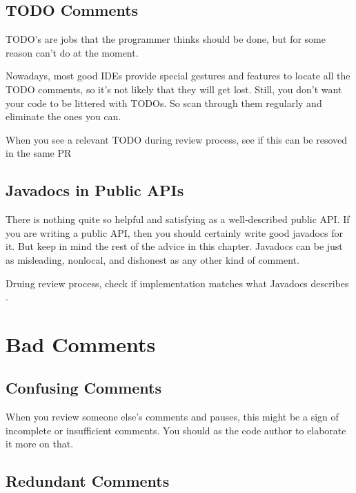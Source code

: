 \subsection{TODO Comments}

TODO's are jobs that the programmer thinks should be done, but for some reason
can’t do at the moment.

Nowadays, most good IDEs provide special gestures and features to locate all the
TODO comments, so it’s not likely that they will get lost. Still, you don’t want your code to be littered with TODOs. So scan through them regularly and eliminate the ones you can.

\begin{marker}
When you see a relevant TODO during review process, see if this can be resoved in the same PR
\end{marker}

\subsection{Javadocs in Public APIs}

There is nothing quite so helpful and satisfying as a well-described public API. If you are writing a public API, then you should certainly write good javadocs for it. But keep in mind the rest of the advice in this chapter. Javadocs can be just as misleading, nonlocal, and dishonest as any other kind of comment.

\begin{marker}
Druing review process, check if implementation matches what Javadocs describes .
\end{marker}

\section{Bad Comments}

\subsection{Confusing Comments}

When you review someone else's comments and pauses, this might be a sign of incomplete or insufficient comments. You should as the code author to elaborate it more on that.

\subsection{Redundant Comments}

